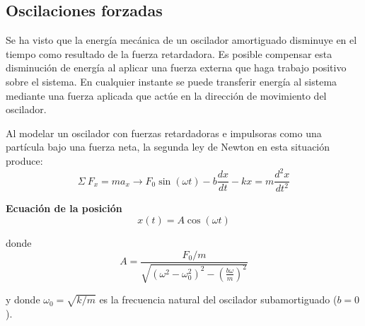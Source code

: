   \subsection{Oscilaciones forzadas}
    \PN Se ha visto que la energía mecánica de un oscilador amortiguado disminuye en el tiempo como resultado de la fuerza
    retardadora. Es posible compensar esta disminución de energía al aplicar una fuerza externa que haga trabajo positivo
    sobre el  sistema. En cualquier instante se puede transferir energía al sistema mediante una fuerza aplicada que actúe
    en la dirección de movimiento del oscilador.

    \PN Al modelar un oscilador con fuerzas retardadoras e impulsoras como una partícula bajo una fuerza neta, la segunda
    ley de Newton en esta situación produce:
    \begin{equation}
      \Sigma \ F_{x} = ma_{x} \rightarrow F_{0} \sin (\omega t) -b \frac{dx}{dt} - kx = m \frac{d^{2}x}{dt^{2}}
    \end{equation}

    \PN \textbf{Ecuación de la posición}
    \begin{equation}
      x(t) = A \cos (\omega t)
    \end{equation}

    \PN donde
    \begin{equation}
      A = \frac{F_{0}/m}{\sqrt{\left(\omega^{2} - \omega_{0}^{2}\right)^{2} - \left(\frac{b\omega}{m}\right)^{2}}}
    \end{equation}

    \PN y donde $\omega_{0} = \sqrt{k/m}$ es la frecuencia natural del oscilador subamortiguado ($b = 0$).
